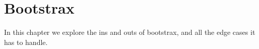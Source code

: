 
\chapter{Bootstrax}

In this chapter we explore the ins and outs of bootstrax, and all the edge cases it has to handle.
